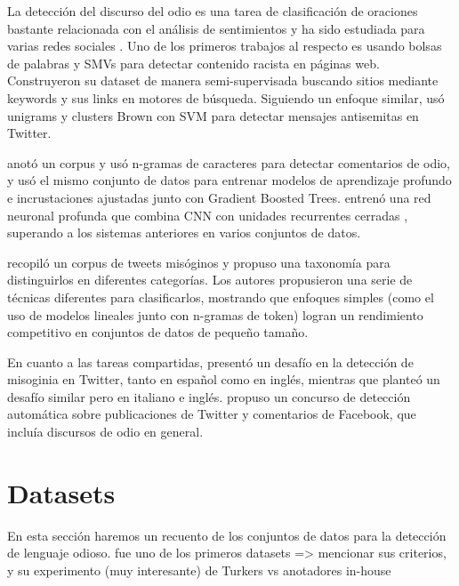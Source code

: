 La detección del discurso del odio es una tarea de clasificación de oraciones bastante relacionada con el análisis de sentimientos y ha sido estudiada para varias redes sociales \cite{thelwall2008social, pak2010twitter, saleem2017web}. Uno de los primeros trabajos al respecto es \citet{greevy2004classifying} usando bolsas de palabras y SMVs para detectar contenido racista en páginas web. Construyeron su dataset de manera semi-supervisada buscando sitios mediante keywords y sus links en motores de búsqueda. Siguiendo un enfoque similar, \citet{warner2012detecting} usó unigrams y clusters Brown con SVM para detectar mensajes antisemitas en Twitter.

\citet{waseem2016hateful} anotó un corpus y usó n-gramas de caracteres para detectar comentarios de odio, y \citet{badjatiya2017deep} usó el mismo conjunto de datos para entrenar modelos de aprendizaje profundo e incrustaciones ajustadas junto con Gradient Boosted Trees. \citet {zhang2018detecting} entrenó una red neuronal profunda que combina CNN con unidades recurrentes cerradas \cite{cho2014learning}, superando a los sistemas anteriores en varios conjuntos de datos.

\citet{anzovino2018automatic} recopiló un corpus de tweets misóginos y propuso una taxonomía para distinguirlos en diferentes categorías. Los autores propusieron una serie de técnicas diferentes para clasificarlos, mostrando que enfoques simples (como el uso de modelos lineales junto con n-gramas de token) logran un rendimiento competitivo en conjuntos de datos de pequeño tamaño.

En cuanto a las tareas compartidas, \citet{fersini2018overview} presentó un desafío en la detección de misoginia en Twitter, tanto en español como en inglés, mientras que \citet{fersini2018evalitaoverview} planteó un desafío similar pero en italiano e inglés. \citet{bosco2018overview} propuso un concurso de detección automática sobre publicaciones de Twitter y comentarios de Facebook, que incluía discursos de odio en general.



\section{Datasets}

En esta sección haremos un recuento de los conjuntos de datos para la detección de lenguaje odioso.
\citet{nobata2016abusive} fue uno de los primeros datasets => mencionar sus criterios, y su experimento (muy interesante) de Turkers vs anotadores in-house

